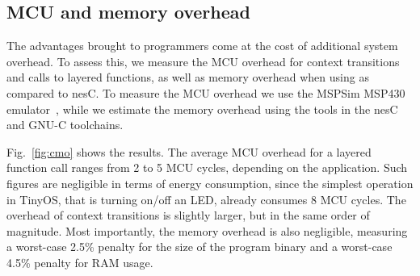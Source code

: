 \subsection{MCU and memory overhead}\label{sec:overhead}

The advantages brought to programmers come at the cost of additional
system overhead. To assess this, we measure the MCU overhead for
context transitions and calls to layered functions, as well as memory
overhead when using \conesc as compared to nesC. To measure the MCU
overhead we use the MSPSim MSP430 emulator~\cite{eriksson09}, while we
estimate the memory overhead using the tools in the nesC and GNU-C
toolchains.


 Fig.~\ref{fig:cmo} shows the results. The average MCU overhead for a layered function
call ranges from 2 to 5 MCU cycles, depending on the application. Such figures
are negligible in terms of energy consumption, since the simplest operation in
TinyOS, that is turning on/off an LED, already consumes 8 MCU cycles. The
overhead of context transitions is slightly larger, but in the same order of
magnitude. Most importantly, the memory overhead is also negligible, measuring a
worst-case 2.5\% penalty for the size of the program binary and a worst-case
4.5\% penalty for RAM usage.

